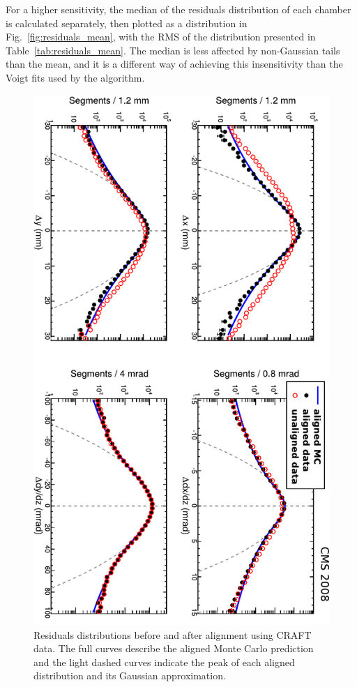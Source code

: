 For a higher sensitivity, the median of the residuals
distribution of each chamber is calculated separately, then plotted as a distribution
in Fig.~\ref{fig:residuals_mean}, with the RMS of the distribution presented
in Table~\ref{tab:residuals_mean}.  The median is less affected by
non-Gaussian tails than the mean, and it is a different way of
achieving this insensitivity than the Voigt fits used by the
algorithm.

\begin{figure}[p]
\centering
\includegraphics[height=0.9\linewidth, angle=90]{plots/gma_hip_results/statscheck_rawresiduals.pdf}
\caption{Residuals distributions before and after alignment using
CRAFT data.  The full curves describe the aligned Monte
Carlo prediction and the light dashed curves indicate the peak
of each aligned distribution and its Gaussian approximation. \label{fig:residuals_all}}
\end{figure}

